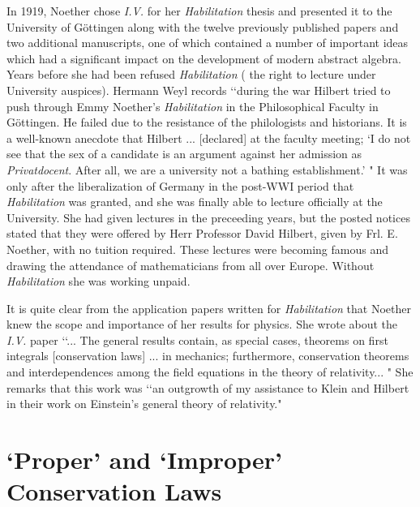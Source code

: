 \documentclass[12pt]{article}
\begin{document}
In 1919, Noether chose {\it{I.V.}} for her {\it{Habilitation}} thesis and presented it
to the University of G\"{o}ttingen along with the twelve previously published
papers and two additional  manuscripts, one of which \cite{schm} contained a
number of important ideas which had a significant impact on the development of
modern abstract algebra. Years before she had been refused {\it{Habilitation}} 
( the right to lecture under University auspices).  Hermann Weyl records
\cite{weyl} \lq\lq during the war Hilbert tried to push through Emmy Noether's
{\it{Habilitation}} in the Philosophical Faculty in G\"{o}ttingen. He failed
due to the resistance of the philologists and historians.  It is a well-known
anecdote that Hilbert ... [declared] at the faculty meeting; \lq I do not see
that the sex of a candidate is an argument against her admission as
{\it{Privatdocent}}. After all, we are a university not a bathing
establishment.' " It was only after the liberalization of Germany in the
post-WWI period that   {\it{ Habilitation}} was granted, and she was finally
able to lecture officially at the University. She had given lectures in the
preceeding years, but the posted notices  stated that they were offered by Herr
Professor David Hilbert,  given by Frl. E. Noether,  with no tuition required.
These  lectures were becoming famous and drawing the attendance of
mathematicians from all over Europe.  Without {\it{Habilitation}} she was
working unpaid.

It is quite clear from                     the application papers written for
{\it{Habilitation}} that Noether knew the scope and importance of her results
for physics. She wrote about the {\it{I.V.}} paper \cite{Dick} \lq\lq ...  The general
results  contain, as special cases, theorems on first integrals [conservation
laws] ... in mechanics; furthermore, conservation theorems and interdependences
among the field equations in the theory of relativity... " She remarks 
that this work was \lq\lq an outgrowth of my assistance to Klein and Hilbert in
their work on Einstein's  general theory of relativity."

\section{`Proper' and  `Improper' Conservation Laws}
\end{document}
